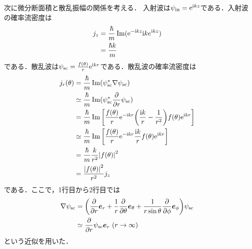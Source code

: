 \documentclass{report}
\begin{document}
  次に微分断面積と散乱振幅の関係を考える．
  入射波は$\psi_{\mathrm{in}} = \mathrm{e}^{\mathrm{i} kz}$である．入射波の確率流密度は
  \begin{align}
    j_z &= \frac{\hbar}{m} \Im (\mathrm{e}^{-\mathrm{i} kz} \mathrm{i} k e^{\mathrm{i} kz}) \\
    &= \frac{\hbar k}{m}
  \end{align}
  である．散乱波は$\psi_{\mathrm{sc}} = \frac{f(\theta)}{r}\mathrm{e}^{\mathrm{i} kr}$である．散乱波の確率流密度は
  \begin{align}
    j_r(\theta) &= \frac{\hbar}{m}\Im (\psi^{*}_{\mathrm{sc}}\nabla\psi_{\mathrm{sc}})\\
    &\simeq \frac{\hbar}{m}\Im (\psi^{*}_{\mathrm{sc}}\frac{\partial}{\partial r}\psi_{\mathrm{sc}})\\
    &= \frac{\hbar}{m} \Im \qty[\frac{f(\theta)}{r} \mathrm{e}^{-\mathrm{i} kr}\qty(\frac{\mathrm{i} k}{r} - \frac{1}{r^2})f(\theta)\mathrm{e}^{\mathrm{i} kr}]\\
    &\simeq \frac{\hbar}{m} \Im \qty[\frac{f(\theta)}{r} \mathrm{e}^{-\mathrm{i} kr}\frac{\mathrm{i} k}{r}f(\theta)\mathrm{e}^{\mathrm{i} kr}]\\
    &= \frac{\hbar}{m}\frac{k}{r^2} \abs{f(\theta)}^2\\
    &= \frac{\abs{f(\theta)}^2}{r^2}j_z
  \end{align}
  である．ここで，1行目から2行目では
  \begin{align}
    \nabla \psi_{\mathrm{sc}} &= \qty(\frac{\partial}{\partial r}\bm{e}_r + \frac{1}{r}\frac{\partial}{\partial \theta}\bm{e}_{\theta} + \frac{1}{r \sin \theta}\frac{\partial}{\partial \phi} \bm{e}_{\phi})\psi_{\mathrm{sc}}\\
    &\simeq \frac{\partial}{\partial r}\psi_{\mathrm{sc}} \bm{e}_r\ (r \to \infty)
  \end{align}
  という近似を用いた．
  
\end{document}
